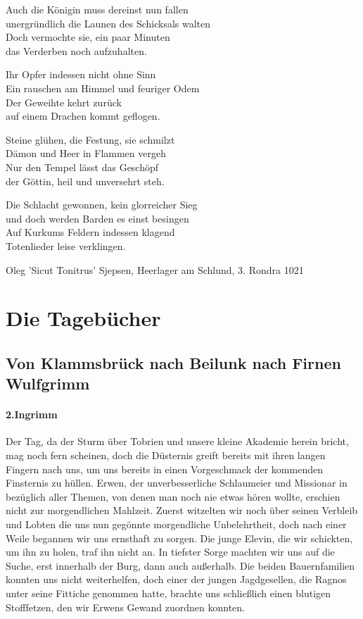Auch die Königin muss dereinst nun fallen\\
unergründlich die Launen des Schicksals walten\\
Doch vermochte sie, ein paar Minuten\\
das Verderben noch aufzuhalten.

Ihr Opfer indessen nicht ohne Sinn\\
Ein rauschen am Himmel und feuriger Odem\\
Der Geweihte kehrt zurück\\
auf einem Drachen kommt geflogen.

Steine glühen, die Festung, sie schmilzt\\
Dämon und Heer in Flammen vergeh\\
Nur den Tempel lässt das Geschöpf\\
der Göttin, heil und unversehrt steh.

Die Schlacht gewonnen, kein glorreicher Sieg\\
und doch werden Barden es einst besingen\\
Auf Kurkums Feldern indessen klagend\\
Totenlieder leise verklingen.

\begin{flushright}
Oleg 'Sicut Tonitrus' Sjepsen, Heerlager am Schlund, 3. Rondra 1021
\end{flushright}


\section{Die Tagebücher}

\subsection{Von Klammsbrück nach Beilunk nach Firnen Wulfgrimm}

\paragraph{2.Ingrimm}
Der Tag, da der Sturm über Tobrien und unsere kleine Akademie herein bricht, mag noch fern scheinen, doch die Düsternis greift bereits mit ihren langen Fingern nach uns, um uns bereits in einen Vorgeschmack der kommenden Finsternis zu hüllen. Erwen, der unverbesserliche Schlaumeier und Missionar in bezüglich aller Themen, von denen man noch nie etwas hören wollte, erschien nicht zur morgendlichen Mahlzeit. Zuerst witzelten wir noch über seinen Verbleib und Lobten die uns nun gegönnte morgendliche Unbelehrtheit, doch nach einer Weile begannen wir uns ernsthaft zu sorgen. Die junge Elevin, die wir schickten, um ihn zu holen, traf ihn nicht an. In tiefster Sorge machten wir uns auf die Suche, erst innerhalb der Burg, dann auch außerhalb. Die beiden Bauernfamilien konnten uns nicht weiterhelfen, doch einer der jungen Jagdgesellen, die Ragnos unter seine Fittiche genommen hatte, brachte uns schließlich einen blutigen Stofffetzen, den wir Erwens Gewand zuordnen konnten. 

